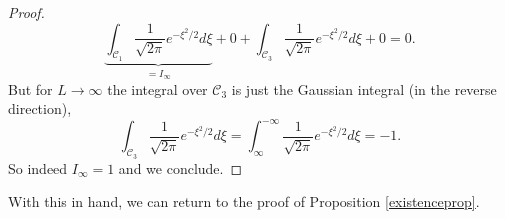 \documentclass{article}
\begin{document}
\begin{proof}
    \begin{equation}
        \underbrace{\int_{\mathcal{C}_1} \dfrac{1}{\sqrt{2\pi}}e^{-\xi^2/2}d\xi}_{=I_\infty} + 0 + \int_{\mathcal{C}_3}\dfrac{1}{\sqrt{2\pi}}e^{-\xi^2/2}d\xi + 0 = 0.
    \end{equation}
    But for $L\to\infty$ the integral over $\mathcal{C}_3$ is just the Gaussian integral (in the reverse direction),
    \begin{equation}
        \int_{\mathcal{C}_3}\dfrac{1}{\sqrt{2\pi}}e^{-\xi^2/2}d\xi =  \int_{\infty}^{-\infty}\dfrac{1}{\sqrt{2\pi}}e^{-\xi^2/2}d\xi = -1.
    \end{equation}
    So indeed $I_{\infty} = 1$ and we conclude.
\end{proof}

With this in hand, we can return to the proof of Proposition \ref{existenceprop}.
\end{document}
